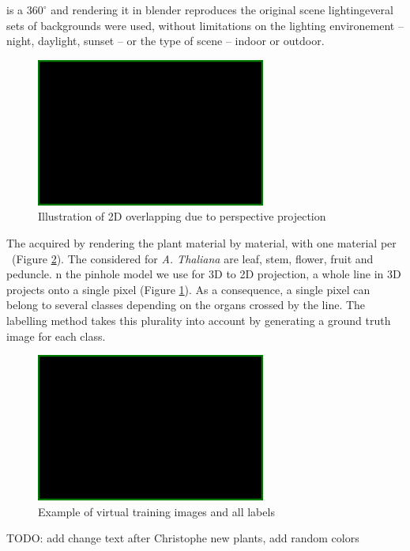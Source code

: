 
 is a $360^{\circ}$
 and rendering it in blender reproduces the
original scene lightingeveral sets of backgrounds were
used, without limitations on the lighting environement -- night, daylight,
sunset -- or the type of scene -- indoor or outdoor.


\begin{figure}[h]
    \centering \includegraphics[width=0.1\linewidth]{figures/blank.png}
    \caption{Illustration of 2D overlapping due to perspective
    projection } \label{fig:pinhole}
\end{figure}

The  acquired by rendering the plant material by material, with one material per
~(Figure \ref{fig:plants}). The
 considered for \emph{A. Thaliana} are leaf, stem, flower,
fruit and peduncle. n the pinhole model \cite{} we use for 3D to 2D
projection, a whole line in 3D projects onto a single pixel (Figure
\ref{fig:pinhole}). As a consequence, a single pixel can belong to
several classes depending on the organs crossed by the line. The
labelling method takes this plurality into account by generating a
ground truth image for each class.

\begin{figure}[h]
    \centering \includegraphics[width=0.1\linewidth]{figures/blank.png}
    \caption{Example of virtual training images and all labels}
    \label{fig:plants}
\end{figure}

TODO: add change text after Christophe new plants, add random colors


